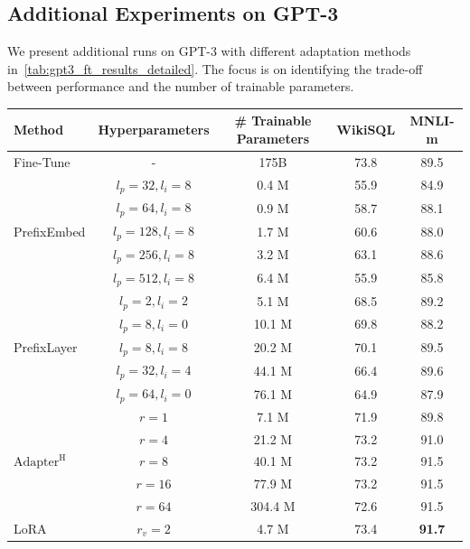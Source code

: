 \documentclass{article} %
\begin{document}
\subsection{Additional Experiments on GPT-3}
\label{app:gpt3_extra}
We present additional runs on GPT-3 with different adaptation methods in~\autoref{tab:gpt3_ft_results_detailed}.
The focus is on identifying the trade-off between performance and the number of trainable parameters.
\begin{table}[h]
\centering
\begin{tabular}{l|c|c|c|c}
\hline
\toprule
Method    & Hyperparameters & \# Trainable Parameters &  WikiSQL & MNLI-m \\
\midrule
Fine-Tune & - & 175B &  73.8 & 89.5 \\
\midrule
\multirow{5}{*}{PrefixEmbed} & $l_p=32, l_i=8$ & 0.4 M & 55.9 & 84.9 \\
                             & $l_p=64, l_i=8$ & 0.9 M & 58.7 & 88.1 \\
                             & $l_p=128, l_i=8$ & 1.7 M & 60.6 & 88.0 \\
                             & $l_p=256, l_i=8$ & 3.2 M & 63.1 & 88.6 \\
                             & $l_p=512, l_i=8$ & 6.4 M & 55.9 & 85.8 \\
\midrule
\multirow{5}{*}{PrefixLayer}
                             & $l_p=2, l_i=2$ & 5.1 M & 68.5 & 89.2 \\
                             & $l_p=8, l_i=0$ & 10.1 M & 69.8 & 88.2 \\
                             & $l_p=8, l_i=8$ & 20.2 M & 70.1 & 89.5 \\
                             & $l_p=32, l_i=4$ & 44.1 M & 66.4 & 89.6 \\
                             & $l_p=64, l_i=0$ & 76.1 M & 64.9 & 87.9 \\
\midrule
\multirow{5}{*}{$\text{Adapter}^{\text{H}}$}
                             & $r=1$ & 7.1 M & 71.9 & 89.8 \\
                             & $r=4$ & 21.2 M & 73.2 & 91.0 \\
                             & $r=8$ & 40.1 M & 73.2 & 91.5 \\
                             & $r=16$& 77.9 M & 73.2 & 91.5 \\
                             & $r=64$& 304.4 M & 72.6 & 91.5 \\
\midrule
\multirow{5}{*}{LoRA}        & $r_{v}=2 $ & 4.7 M & 73.4 & \textbf{91.7} \\

\end{tabular}
\end{table}
\end{document}
